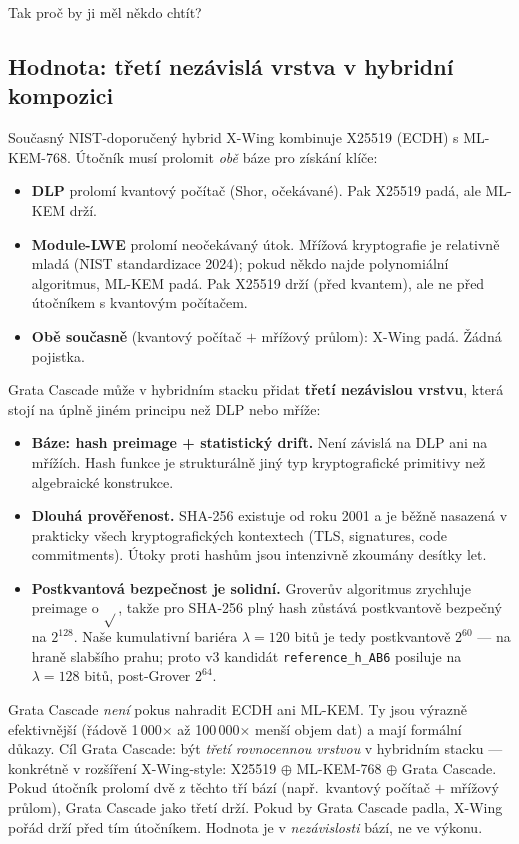 \documentclass[11pt,a4paper]{article}
\begin{document}
Tak proč by ji měl někdo chtít?

\subsection{Hodnota: třetí nezávislá vrstva v hybridní kompozici}

Současný NIST-doporučený hybrid X-Wing kombinuje X25519 (ECDH) s ML-KEM-768. Útočník musí prolomit \emph{obě} báze pro získání klíče:

\begin{itemize}[leftmargin=*]
\item \textbf{DLP} prolomí kvantový počítač (Shor, očekávané). Pak X25519 padá, ale ML-KEM drží.
\item \textbf{Module-LWE} prolomí neočekávaný útok. Mřížová kryptografie je relativně mladá (NIST standardizace 2024); pokud někdo najde polynomiální algoritmus, ML-KEM padá. Pak X25519 drží (před kvantem), ale ne před útočníkem s kvantovým počítačem.
\item \textbf{Obě současně} (kvantový počítač $+$ mřížový průlom): X-Wing padá. Žádná pojistka.
\end{itemize}

Grata Cascade může v hybridním stacku přidat \textbf{třetí nezávislou vrstvu}, která stojí na úplně jiném principu než DLP nebo mříže:

\begin{itemize}[leftmargin=*]
\item \textbf{Báze: hash preimage + statistický drift.} Není závislá na DLP ani na mřížích. Hash funkce je strukturálně jiný typ kryptografické primitivy než algebraické konstrukce.
\item \textbf{Dlouhá prověřenost.} SHA-256 existuje od roku 2001 a je běžně nasazená v prakticky všech kryptografických kontextech (TLS, signatures, code commitments). Útoky proti hashům jsou intenzivně zkoumány desítky let.
\item \textbf{Postkvantová bezpečnost je solidní.} Groverův algoritmus zrychluje preimage o $\sqrt{}$, takže pro SHA-256 plný hash zůstává postkvantově bezpečný na $2^{128}$. Naše kumulativní bariéra $\lambda = 120$ bitů je tedy postkvantově $2^{60}$ --- na hraně slabšího prahu; proto v3 kandidát \texttt{reference\_h\_AB6} posiluje na $\lambda = 128$ bitů, post-Grover $2^{64}$.
\end{itemize}

\begin{aha}
Grata Cascade \emph{není} pokus nahradit ECDH ani ML-KEM. Ty jsou výrazně efektivnější (řádově 1\,000$\times$ až 100\,000$\times$ menší objem dat) a mají formální důkazy. Cíl Grata Cascade: být \emph{třetí rovnocennou vrstvou} v hybridním stacku --- konkrétně v rozšíření X-Wing-style: X25519 $\oplus$ ML-KEM-768 $\oplus$ Grata Cascade. Pokud útočník prolomí dvě z těchto tří bází (např.\ kvantový počítač $+$ mřížový průlom), Grata Cascade jako třetí drží. Pokud by Grata Cascade padla, X-Wing pořád drží před tím útočníkem. Hodnota je v \emph{nezávislosti} bází, ne ve výkonu.
\end{aha}
\end{document}
